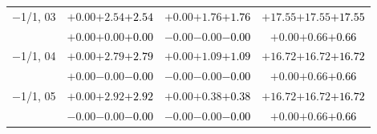 \documentclass[compress]{beamer}
\begin{document}
\begin{frame}
\begin{tabular}{r | c | c | c}
$-$1/1, 03 & $+0.00$\hspace{0.1 cm}$+2.54$\hspace{0.1 cm}\textcolor{black}{$+2.54$} & $+0.00$\hspace{0.1 cm}$+1.76$\hspace{0.1 cm}\textcolor{black}{$+1.76$} & $+17.55$\hspace{0.1 cm}$+17.55$\hspace{0.1 cm}\textcolor{black}{$+17.55$} \\
           & $+0.00$\hspace{0.1 cm}$+0.00$\hspace{0.1 cm}\textcolor{black}{$+0.00$} & $-0.00$\hspace{0.1 cm}$-0.00$\hspace{0.1 cm}\textcolor{black}{$-0.00$} & $+0.00$\hspace{0.1 cm}$+0.66$\hspace{0.1 cm}\textcolor{black}{$+0.66$} \\
$-$1/1, 04 & $+0.00$\hspace{0.1 cm}$+2.79$\hspace{0.1 cm}\textcolor{black}{$+2.79$} & $+0.00$\hspace{0.1 cm}$+1.09$\hspace{0.1 cm}\textcolor{black}{$+1.09$} & $+16.72$\hspace{0.1 cm}$+16.72$\hspace{0.1 cm}\textcolor{black}{$+16.72$} \\
           & $+0.00$\hspace{0.1 cm}$-0.00$\hspace{0.1 cm}\textcolor{black}{$-0.00$} & $-0.00$\hspace{0.1 cm}$-0.00$\hspace{0.1 cm}\textcolor{black}{$-0.00$} & $+0.00$\hspace{0.1 cm}$+0.66$\hspace{0.1 cm}\textcolor{black}{$+0.66$} \\
$-$1/1, 05 & $+0.00$\hspace{0.1 cm}$+2.92$\hspace{0.1 cm}\textcolor{black}{$+2.92$} & $+0.00$\hspace{0.1 cm}$+0.38$\hspace{0.1 cm}\textcolor{black}{$+0.38$} & $+16.72$\hspace{0.1 cm}$+16.72$\hspace{0.1 cm}\textcolor{black}{$+16.72$} \\
           & $-0.00$\hspace{0.1 cm}$-0.00$\hspace{0.1 cm}\textcolor{black}{$-0.00$} & $-0.00$\hspace{0.1 cm}$-0.00$\hspace{0.1 cm}\textcolor{black}{$-0.00$} & $+0.00$\hspace{0.1 cm}$+0.66$\hspace{0.1 cm}\textcolor{black}{$+0.66$} \\

\end{tabular}
\end{frame}
\end{document}
